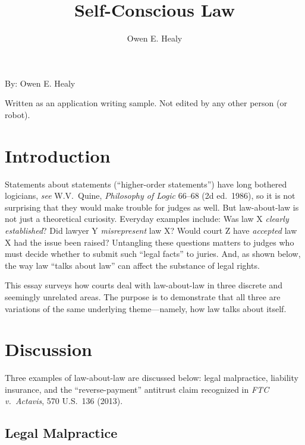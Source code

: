 \documentclass[
  12pt,
  letterpaper,
]{scrartcl}
\title{Self-Conscious Law}
\author{Owen E. Healy}
\begin{document}
\begin{center}\end{center}
  
\vspace{12pt}\noindent\begin{minipage}{4in}
  \setlength{\parskip}{6pt}
  
  \noindent By: Owen E. Healy

  \noindent Written as an application writing sample. Not edited by any other person (or robot).
\end{minipage}


\vspace{12pt}\section{Introduction}

Statements about statements (``higher-order statements'') have long bothered
logicians, \textit{see} W.V.~Quine, \textit{Philosophy of Logic} 66--68 (2d
ed.~1986), so it is not surprising that they would make trouble for judges as
well. But law-about-law is not just a theoretical curiosity. Everyday examples
include: Was law X \emph{clearly established}? Did lawyer Y \emph{misrepresent}
law X? Would court Z have \emph{accepted} law X had the issue been raised?
Untangling these questions matters to judges who must decide whether to submit
such ``legal facts'' to juries. And, as shown below, the way law ``talks about
law'' can affect the substance of legal rights.

This essay surveys how courts deal with law-about-law in three discrete and
seemingly unrelated areas. The purpose is to demonstrate that all three are
variations of the same underlying theme---namely, how law talks about itself.


\section{Discussion}

Three examples of law-about-law are discussed below: legal malpractice,
liability insurance, and the ``reverse-payment'' antitrust claim recognized
in \textit{FTC v.~Actavis}, 570 U.S.~136 (2013).


\subsection{Legal Malpractice}
\end{document}
